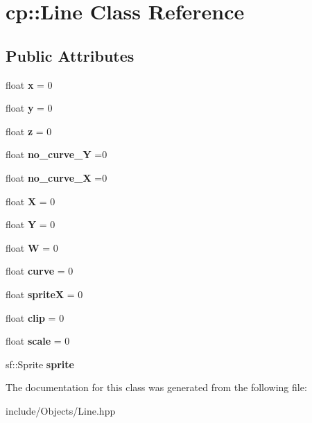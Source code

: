 \hypertarget{classcp_1_1_line}{}\section{cp\+:\+:Line Class Reference}
\label{classcp_1_1_line}
\subsection*{Public Attributes}
\begin{DoxyCompactItemize}
\item 
\mbox{\label{classcp_1_1_line_ad39096f1a4e28c48faabce5a35f37be2}} 
float {\bfseries x} = 0
\item 
\mbox{\label{classcp_1_1_line_afad3adaec719dfc12cc3e21215f8ece7}} 
float {\bfseries y} = 0
\item 
\mbox{\label{classcp_1_1_line_aba081d41ceec386aed5f57a11cf90248}} 
float {\bfseries z} = 0
\item 
\mbox{\label{classcp_1_1_line_aa9d0f92906b4d96fd91998ee51c42dd6}} 
float {\bfseries no\+\_\+curve\+\_\+Y} =0
\item 
\mbox{\label{classcp_1_1_line_a8f4c6f1af7be861968c978a9f9afef52}} 
float {\bfseries no\+\_\+curve\+\_\+X} =0
\item 
\mbox{\label{classcp_1_1_line_af47b43ff016a7bf5d86e353c3f6c4d45}} 
float {\bfseries X} = 0
\item 
\mbox{\label{classcp_1_1_line_a60c932563c7ddfd43e715bdb61f31a4f}} 
float {\bfseries Y} = 0
\item 
\mbox{\label{classcp_1_1_line_a07318dd5254a404e229abab62e71570a}} 
float {\bfseries W} = 0
\item 
\mbox{\label{classcp_1_1_line_ae9394f9580f35c70fba57db645c5ad8e}} 
float {\bfseries curve} = 0
\item 
\mbox{\label{classcp_1_1_line_a32a7dc49aa15151b936e60f30cbe510e}} 
float {\bfseries spriteX} = 0
\item 
\mbox{\label{classcp_1_1_line_a1415d74381e2468699200edde9e079d8}} 
float {\bfseries clip} = 0
\item 
\mbox{\label{classcp_1_1_line_a56dde9092a2b1de12b8209475abaf416}} 
float {\bfseries scale} = 0
\item 
\mbox{\label{classcp_1_1_line_af89dbcf4998239674db789519e50b48b}} 
sf\+::\+Sprite {\bfseries sprite}
\end{DoxyCompactItemize}


The documentation for this class was generated from the following file\+:\begin{DoxyCompactItemize}
\item 
include/\+Objects/Line.\+hpp\end{DoxyCompactItemize}

